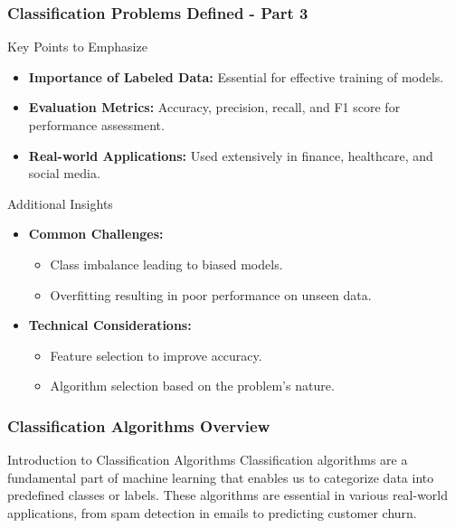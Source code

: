 \documentclass[aspectratio=169]{beamer}
\begin{document}
\begin{frame}[fragile]
    \frametitle{Classification Problems Defined - Part 3}
    \begin{block}{Key Points to Emphasize}
        \begin{itemize}
            \item \textbf{Importance of Labeled Data:} Essential for effective training of models.
            \item \textbf{Evaluation Metrics:} Accuracy, precision, recall, and F1 score for performance assessment.
            \item \textbf{Real-world Applications:} Used extensively in finance, healthcare, and social media.
        \end{itemize}
    \end{block}

    \begin{block}{Additional Insights}
        \begin{itemize}
            \item \textbf{Common Challenges:}
                \begin{itemize}
                    \item Class imbalance leading to biased models.
                    \item Overfitting resulting in poor performance on unseen data.
                \end{itemize}
            \item \textbf{Technical Considerations:}
                \begin{itemize}
                    \item Feature selection to improve accuracy.
                    \item Algorithm selection based on the problem’s nature.
                \end{itemize}
        \end{itemize}
    \end{block}
\end{frame}

\begin{frame}[fragile]
    \frametitle{Classification Algorithms Overview}
    
    \begin{block}{Introduction to Classification Algorithms}
        Classification algorithms are a fundamental part of machine learning that enables us to categorize data into predefined classes or labels. 
        These algorithms are essential in various real-world applications, from spam detection in emails to predicting customer churn.
    \end{block}
\end{frame}
\end{document}
